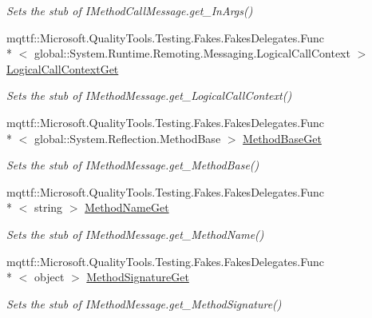\begin{DoxyCompactItemize}
\begin{DoxyCompactList}\small\item\em Sets the stub of I\-Method\-Call\-Message.\-get\-\_\-\-In\-Args()\end{DoxyCompactList}\item 
mqttf\-::\-Microsoft.\-Quality\-Tools.\-Testing.\-Fakes.\-Fakes\-Delegates.\-Func\\*
$<$ global\-::\-System.\-Runtime.\-Remoting.\-Messaging.\-Logical\-Call\-Context $>$ \hyperlink{class_system_1_1_runtime_1_1_remoting_1_1_messaging_1_1_fakes_1_1_stub_i_method_call_message_af36a7963a5a7a21749307c7be047f067}{Logical\-Call\-Context\-Get}
\begin{DoxyCompactList}\small\item\em Sets the stub of I\-Method\-Message.\-get\-\_\-\-Logical\-Call\-Context()\end{DoxyCompactList}\item 
mqttf\-::\-Microsoft.\-Quality\-Tools.\-Testing.\-Fakes.\-Fakes\-Delegates.\-Func\\*
$<$ global\-::\-System.\-Reflection.\-Method\-Base $>$ \hyperlink{class_system_1_1_runtime_1_1_remoting_1_1_messaging_1_1_fakes_1_1_stub_i_method_call_message_a650073f88db1eba8e16c4a6cee44f9fd}{Method\-Base\-Get}
\begin{DoxyCompactList}\small\item\em Sets the stub of I\-Method\-Message.\-get\-\_\-\-Method\-Base()\end{DoxyCompactList}\item 
mqttf\-::\-Microsoft.\-Quality\-Tools.\-Testing.\-Fakes.\-Fakes\-Delegates.\-Func\\*
$<$ string $>$ \hyperlink{class_system_1_1_runtime_1_1_remoting_1_1_messaging_1_1_fakes_1_1_stub_i_method_call_message_a7f097a0317b63add9da0fbb222cde617}{Method\-Name\-Get}
\begin{DoxyCompactList}\small\item\em Sets the stub of I\-Method\-Message.\-get\-\_\-\-Method\-Name()\end{DoxyCompactList}\item 
mqttf\-::\-Microsoft.\-Quality\-Tools.\-Testing.\-Fakes.\-Fakes\-Delegates.\-Func\\*
$<$ object $>$ \hyperlink{class_system_1_1_runtime_1_1_remoting_1_1_messaging_1_1_fakes_1_1_stub_i_method_call_message_a5339de07f0869b374982598530319ac4}{Method\-Signature\-Get}
\begin{DoxyCompactList}\small\item\em Sets the stub of I\-Method\-Message.\-get\-\_\-\-Method\-Signature()\end{DoxyCompactList}\item 

\end{DoxyCompactItemize}
